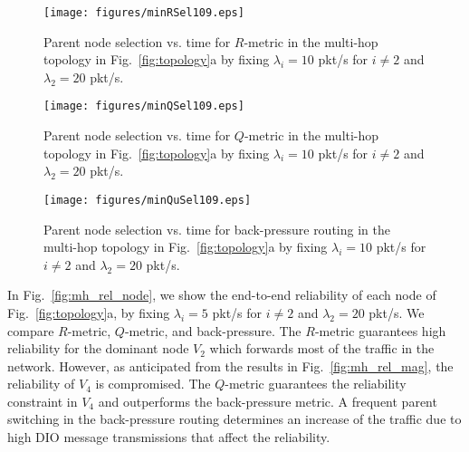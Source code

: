\documentclass[review, 1p, 11pt]{elsarticle}
\numberwithin{equation}{section}
\begin{document}
 \begin{figure}[h] \centering
\texttt{[image: figures/minRSel109.eps]}
\caption{Parent node selection vs. time for $R$-metric in the multi-hop topology in Fig.~\ref{fig:topology}a by fixing $\lambda_i=10$ pkt/s for $i\neq2$ and $\lambda_2=20$ pkt/s.
 \label{fig:route_r}}
\end{figure}


 \begin{figure}[h] \centering
\texttt{[image: figures/minQSel109.eps]}
\caption{Parent node selection vs. time for $Q$-metric in the multi-hop topology in Fig.~\ref{fig:topology}a by fixing $\lambda_i=10$ pkt/s for $i\neq2$ and $\lambda_2=20$ pkt/s.
 \label{fig:route_q}}
\end{figure}

 \begin{figure}[h] \centering
\texttt{[image: figures/minQuSel109.eps]}
\caption{Parent node selection vs. time for back-pressure routing in the multi-hop topology in Fig.~\ref{fig:topology}a by fixing $\lambda_i=10$ pkt/s for $i\neq2$ and $\lambda_2=20$ pkt/s.
 \label{fig:route_back}}
\end{figure}






In Fig.~\ref{fig:mh_rel_node}, we show the end-to-end reliability of each node of Fig.~\ref{fig:topology}a, by fixing $\lambda_i=5$ pkt/s for $i\neq2$ and $\lambda_2=20$ pkt/s. We compare $R$-metric, $Q$-metric, and back-pressure. The $R$-metric guarantees high reliability for the dominant node $V_2$ which forwards most of the traffic in the network. However, as anticipated from the results in Fig.~\ref{fig:mh_rel_mag}, the reliability of $V_4$ is compromised. The $Q$-metric guarantees the reliability constraint in $V_4$ and outperforms the back-pressure metric. A frequent parent switching in the back-pressure routing determines an increase of the traffic due to high DIO message transmissions that affect the reliability.
\end{document}
